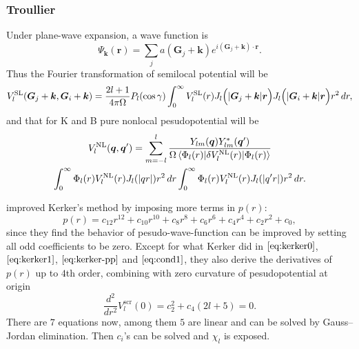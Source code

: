 
\subsubsection{Troullier}
\label{sssec:troullier}

Under plane-wave expansion, a wave function is
\begin{equation}
	\Psi_{\bm{k}} (\bm{r}) = \sum_{j}
	a (\bm{G}_j + \bm{k}) e^{i (\bm{G}_j + \bm{k}) \cdot \bm{r}}.
\end{equation}
Thus the Fourier transformation of semilocal potential will be
\begin{equation}
	V_l^\text{SL} (\bm{G}_j + \bm{k}, \bm{G}_i + \bm{k})
	= \frac{ 2l+1 }{ 4\pi \Omega } P_l (\cos \gamma)
	\int_{0}^{\infty} V_l^\text{SL} (r)
	J_l \Big(\abs{\bm{G}_j + \bm{k}} \bm{r} \Big)
	J_l \Big(\abs{\bm{G}_i + \bm{k}} \bm{r} \Big) r^2 \, dr,
\end{equation}
and that for K and B pure nonlocal pesudopotential will be
\begin{multline}
	V_l^\text{NL} (\bm{q}, \bm{q}')
	= \sum_{m = -l}^{l}
	\frac{ Y_{lm} (\bm{q}) Y_{lm}^\ast (\bm{q}') }{ \Omega
		\braket{ \Phi_{l} (r) | \delta V_l^\text{NL} (r) | \Phi_{l} (r) }} \\
	\int_{0}^{\infty} \Phi_{l} (r) V_l^\text{NL} (r) J_l (\abs{q r}) r^2 \, dr
	\int_{0}^{\infty} \Phi_{l} (r) V_l^\text{NL} (r) J_l (\abs{q' r}) r^2 \, dr.
\end{multline}

\citeauthor{Troullier:1991ey} improved Kerker's method \cite{Kerker:1980cs} by imposing more
terms in $p(r)$:
\begin{equation}
	p(r) = c_{12} r^{12} + c_{10} r^{10} + c_8 r^8 + c_6 r^6 + c_4 r^4 + c_2 r^2 + c_0,
\end{equation}
since they find the behavior of pesudo-wave-function can be improved by setting all odd coefficients
to be zero. Except for what Kerker did in $\eqref{eq:kerker0}$, $\eqref{eq:kerker1}$,
$\eqref{eq:kerker-pp}$ and $\eqref{eq:cond1}$,
they also derive the derivatives of $p(r)$ up to $4$th order,
combining with zero curvature of pesudopotential at origin
\begin{equation}
	\frac{ d^2 }{ d r^2 } V_l^\text{scr} (0) = c_2^2 + c_4 (2 l + 5) = 0.
\end{equation}
There are $7$ equations now, among them $5$ are linear and can be solved by Gauss--Jordan
elimination.
Then $c_i$'s can be solved and $\chi_l$ is exposed.


